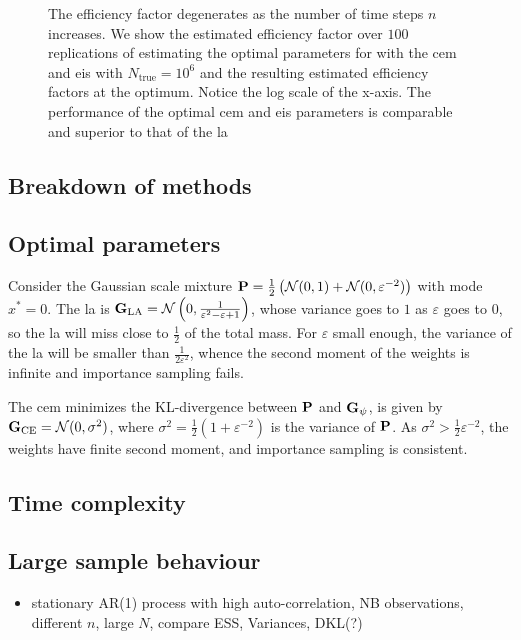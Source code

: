 \begin{figure}
    \resizebox{\textwidth}{!}{%
    }
    \caption{The efficiency factor degenerates as the number of time steps $n$ increases. We show the estimated efficiency factor over $100$ replications of estimating the optimal parameters for  with the \gls{cem} and \gls{eis} with $N_{\text{true}} = 10^{6}$ and the resulting estimated efficiency factors at the optimum. Notice the log scale of the x-axis. The performance of the optimal \gls{cem} and \gls{eis} parameters is comparable and superior to that of the \gls{la}}
    \label{fig:ef_time_dimension}
\end{figure}


\subsection{Breakdown of methods}

\subsection{Optimal parameters}

\begin{example}
  \label{ex:la_failure}
  Consider the Gaussian scale mixture $\P = \frac{1}{2} \left(\mathcal N (0,1) + \mathcal N(0, \varepsilon^{-2})\right)$ with mode $x^{\ast}=0$. 
  The \gls{la} is $\G_{\text{LA}} = \mathcal N \left( 0, \frac{1}{\varepsilon^{2} - \varepsilon + 1} \right)$, whose variance goes to $1$ as $\varepsilon$ goes to $0$, so the \gls{la} will miss close to $\frac 1 2$ of the total mass.
  For $\varepsilon$ small enough, the variance of the \gls{la} will be smaller than $\frac{1}{2\varepsilon^{2}}$, whence the second moment of the weights is infinite and importance sampling fails.

  The \gls{cem} minimizes the KL-divergence between $\P$ and $\G_{\psi}$, is given by $\G_{\text{CE}} = \mathcal N (0, \sigma^{2})$, where $\sigma^{2} = \frac{1}{2}\left( 1 + \varepsilon^{-2} \right)$ is the variance of $\P$.
  As $\sigma^{2} > \frac{1}{2}\varepsilon^{-2}$, the weights have finite second moment, and importance sampling is consistent.
\end{example}

\subsection{Time complexity}

\subsection{Large sample behaviour}

\begin{itemize}
    \item stationary AR(1) process with high auto-correlation, NB observations, different $n$, large $N$, compare ESS, Variances, DKL(?)
\end{itemize}
